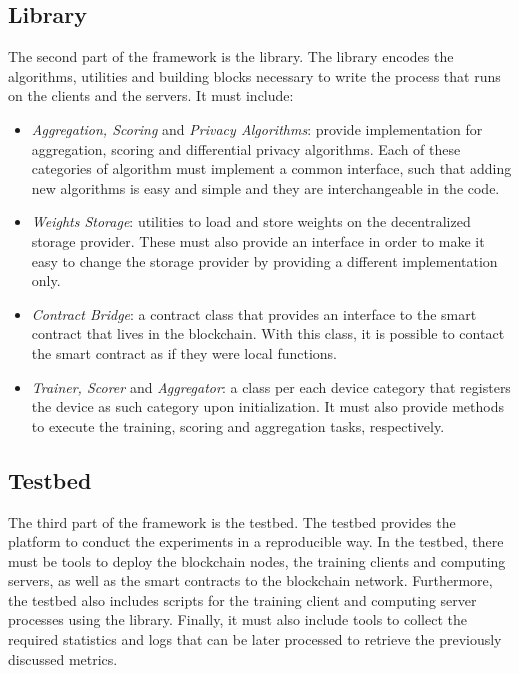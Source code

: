 \subsection{Library}

The second part of the framework is the library. The library encodes the algorithms, utilities and building blocks necessary to write the process that runs on the clients and the servers. It must include:

\begin{itemize}
    \item \textit{Aggregation, Scoring} and \textit{Privacy Algorithms}: provide implementation for aggregation, scoring and differential privacy algorithms. Each of these categories of algorithm must implement a common interface, such that adding new algorithms is easy and simple and they are interchangeable in the code.
    
    \item \textit{Weights Storage}: utilities to load and store weights on the decentralized storage provider. These must also provide an interface in order to make it easy to change the storage provider by providing a different implementation only.
    
    \item \textit{Contract Bridge}: a contract class that provides an interface to the smart contract that lives in the blockchain. With this class, it is possible to contact the smart contract as if they were local functions.
    
    \item \textit{Trainer, Scorer} and \textit{Aggregator}: a class per each device category that registers the device as such category upon initialization. It must also provide methods to execute the training, scoring and aggregation tasks, respectively.
\end{itemize}

\subsection{Testbed}

The third part of the framework is the testbed. The testbed provides the platform to conduct the experiments in a reproducible way. In the testbed, there must be tools to deploy the blockchain nodes, the training clients and computing servers, as well as the smart contracts to the blockchain network. Furthermore, the testbed also includes scripts for the training client and computing server processes using the library. Finally, it must also include tools to collect the required statistics and logs that can be later processed to retrieve the previously discussed metrics.

